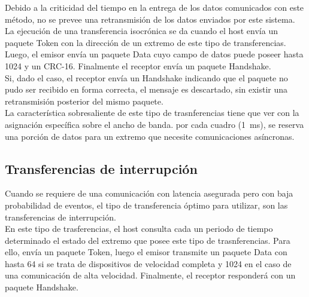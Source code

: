 	Debido a la criticidad del tiempo en la entrega de los datos comunicados con este método, no se prevee una retransmisión de los datos enviados por este sistema.\\
	
	La ejecución de una transferencia isocrónica se da cuando el host envía un paquete Token con la dirección de un extremo de este tipo de transferencias. Luego, el emisor envía un paquete Data cuyo campo de datos puede poseer hasta \SI{1024}{\byte} y un CRC-16. Finalmente el receptor envía un paquete Handshake.\\
	
	Si, dado el caso, el receptor envía un Handshake indicando que el paquete no pudo ser recibido en forma correcta, el mensaje es descartado, sin existir una retransmisión posterior del mismo paquete.\\
	
	La característica sobresaliente de este tipo de trasnferencias tiene que ver con la asignación específica sobre el ancho de banda. por cada cuadro (\SI{1}{\milli\second}), se reserva una porción de datos para un extremo que necesite comunicaciones asíncronas.\\
	
\subsection{Transferencias de interrupción}
	Cuando se requiere de una comunicación con latencia asegurada pero con baja probabilidad de eventos, el tipo de transferencia óptimo para utilizar, son las transferencias de interrupción.\\
	
	En este tipo de trasferencias, el host consulta cada un periodo de tiempo determinado el estado del extremo que posee este tipo de trasnferencias. Para ello, envía un paquete Token, luego el emisor transmite un paquete Data con hasta \SI{64}{\byte} si se trata de dispositivos de velocidad completa y \SI{1024}{\byte} en el caso de una comunicación de alta velocidad. Finalmente, el receptor responderá con un paquete Handshake.\\
